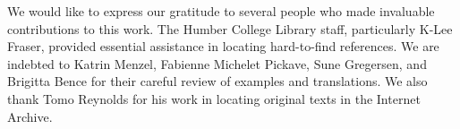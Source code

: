 \addchap{\lsAcknowledgementTitle} 

We would like to express our gratitude to several people who made invaluable contributions to this work. The Humber College Library staff, particularly K-Lee Fraser, provided essential assistance in locating hard-to-find references. We are indebted to Katrin Menzel, Fabienne Michelet Pickave, Sune Gregersen, and Brigitta Bence for their careful review of examples and translations. We also thank Tomo Reynolds for his work in locating original texts in the Internet Archive.

















